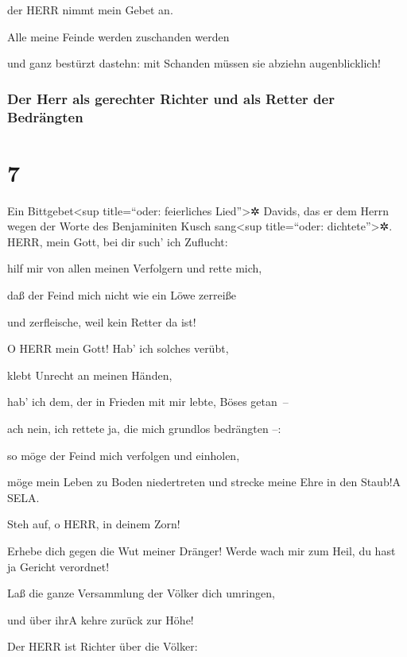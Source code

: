 der HERR nimmt mein Gebet an.

Alle meine Feinde werden zuschanden werden

und ganz bestürzt dastehn: mit Schanden müssen sie abziehn
augenblicklich!

\hypertarget{der-herr-als-gerechter-richter-und-als-retter-der-bedruxe4ngten}{%
\subsubsection{Der Herr als gerechter Richter und als Retter der
Bedrängten}\label{der-herr-als-gerechter-richter-und-als-retter-der-bedruxe4ngten}}

\hypertarget{section-6}{%
\section{7}\label{section-6}}

Ein Bittgebet\textless sup title=``oder: feierliches
Lied''\textgreater✲ Davids, das er dem Herrn wegen der Worte des
Benjaminiten Kusch sang\textless sup title=``oder:
dichtete''\textgreater✲. HERR, mein Gott, bei dir such'
ich Zuflucht:

hilf mir von allen meinen Verfolgern und rette mich,

daß der Feind mich nicht wie ein Löwe zerreiße

und zerfleische, weil kein Retter da ist!

O HERR mein Gott! Hab' ich solches verübt,

klebt Unrecht an meinen Händen,

hab' ich dem, der in Frieden mit mir lebte, Böses getan~--

ach nein, ich rettete ja, die mich grundlos bedrängten --:

so möge der Feind mich verfolgen und einholen,

möge mein Leben zu Boden niedertreten und strecke meine Ehre in den
Staub!{A} SELA.

Steh auf, o HERR, in deinem Zorn!

Erhebe dich gegen die Wut meiner Dränger! Werde wach mir zum Heil, du
hast ja Gericht verordnet!

Laß die ganze Versammlung der Völker dich umringen,

und über ihr{A} kehre zurück zur Höhe!

Der HERR ist Richter über die Völker:

